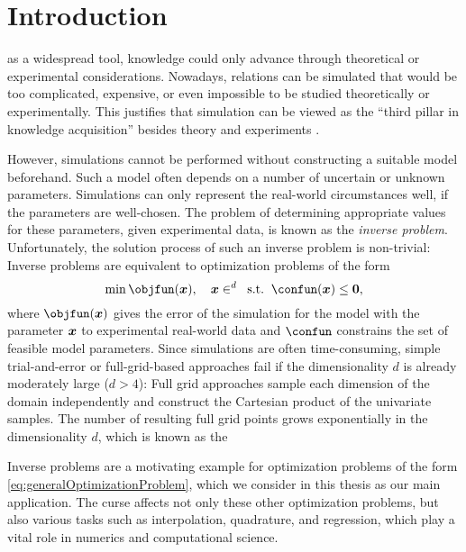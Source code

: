 
\chapter{Introduction}
\label{chap:10introduction}

as a widespread tool,
knowledge could only advance through theoretical or
experimental considerations.
Nowadays, relations can be simulated
that would be too complicated, expensive, or even impossible
to be studied theoretically or experimentally.
This justifies that simulation can be viewed as the
``third pillar in knowledge acquisition''
besides theory and experiments \cite{Bungartz14Modeling}.

However, simulations cannot be performed without constructing
a suitable model beforehand.
Such a model often depends on a number of uncertain or unknown parameters.
Simulations can only represent the real-world circumstances well,
if the parameters are well-chosen.
The problem of determining appropriate values for these parameters,
given experimental data, is known as the \emph{inverse problem}.
Unfortunately, the solution process of such an inverse problem is non-trivial:
Inverse problems are equivalent to optimization problems of the form
\begin{equation}
  \label{eq:generalOptimizationProblem}
  \min \objfun(\*x),\quad
  \*x \in \real^d\;\;\text{s.t.}\;\;
  \confun(\*x) \le \*0,
\end{equation}
where $\objfun(\*x)$ gives the error of the simulation for the model with
the parameter ${\boldsymbol{x}}$ to experimental real-world data and
$\confun$ constrains the set of feasible model parameters.
Since simulations are often time-consuming,
simple trial-and-error or full-grid-based approaches fail
if the dimensionality $d$ is already moderately large ($d > 4$):
Full grid approaches sample each dimension of the domain
independently and construct the Cartesian product of the univariate
samples.
The number of resulting full grid points
grows exponentially in the dimensionality $d$,
which is known as the 

Inverse problems are a motivating example for optimization problems
of the form \eqref{eq:generalOptimizationProblem}, which we consider in
this thesis as our main application.
The curse affects not only these other optimization problems,
but also various tasks such as interpolation, quadrature, and regression,
which play a vital role in numerics and computational science.

